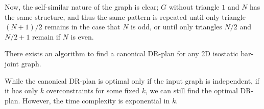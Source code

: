 Now, the self-similar nature of the graph is clear; $G$ without triangle $1$ and $N$ has the same structure, and thus the same pattern is repeated until only triangle $(N+1)/2$ remains in the case that $N$ is odd, or until only triangles $N/2$ and $N/2+1$ remain if $N$ is even.










\begin{theorem}\label{theorem:algo_complexity}
    There exists an \candrpcomplexityv algorithm to find a canonical DR-plan for any 2D isostatic bar-joint graph.
\end{theorem}

\begin{remark}
    While the canonical DR-plan is optimal only if the input graph is independent, if it has only $k$ overconstraints for some fixed $k$, we can still find the optimal DR-plan. However, the time complexity is exponential in $k$.
\end{remark}
